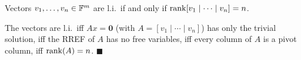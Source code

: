 \begin{propbox}
\label{prop:rank-li}
Vectors $v_1,\ldots,v_n\in\mathbb{F}^m$ are l.i.\ if and only if
$\operatorname{rank}[v_1\mid\cdots\mid v_n]=n$.
\end{propbox}

\begin{proofbox}
The vectors are l.i.\ iff $Ax=\mathbf{0}$ (with $A=[v_1\mid\cdots\mid v_n]$)
has only the trivial solution, iff the RREF of $A$ has no free variables, iff
every column of $A$ is a pivot column, iff $\operatorname{rank}(A)=n$.
\hfill$\blacksquare$
\end{proofbox}
